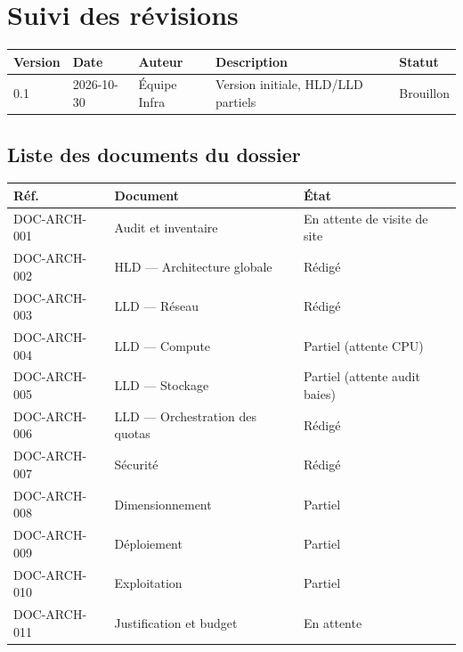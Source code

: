 \chapter*{Suivi des révisions}
\begin{tabularx}{\textwidth}{@{}lllXl@{}}
\toprule
\textbf{Version} & \textbf{Date} & \textbf{Auteur} & \textbf{Description} & \textbf{Statut} \\
\midrule
0.1 & 2026-10-30 & Équipe Infra & Version initiale, HLD/LLD partiels & Brouillon \\
\bottomrule
\end{tabularx}

\vspace{0.6cm}
\section*{Liste des documents du dossier}
\begin{tabularx}{\textwidth}{@{}llX@{}}
\toprule
\textbf{Réf.} & \textbf{Document} & \textbf{État} \\
\midrule
DOC-ARCH-001 & Audit et inventaire & En attente de visite de site \\
DOC-ARCH-002 & HLD — Architecture globale & Rédigé \\
DOC-ARCH-003 & LLD — Réseau & Rédigé \\
DOC-ARCH-004 & LLD — Compute & Partiel (attente CPU) \\
DOC-ARCH-005 & LLD — Stockage & Partiel (attente audit baies) \\
DOC-ARCH-006 & LLD — Orchestration des quotas & Rédigé \\
DOC-ARCH-007 & Sécurité & Rédigé \\
DOC-ARCH-008 & Dimensionnement & Partiel \\
DOC-ARCH-009 & Déploiement & Partiel \\
DOC-ARCH-010 & Exploitation & Partiel \\
DOC-ARCH-011 & Justification et budget & En attente \\
\bottomrule
\end{tabularx}